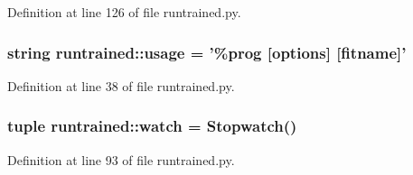 Definition at line 126 of file runtrained.py.

\hypertarget{namespaceruntrained_a4b1ea2d8f802d90d901c0d20819bc700}{
\subsubsection[{usage}]{\setlength{\rightskip}{0pt plus 5cm}string {\bf runtrained::usage} = '\%prog \mbox{[}options\mbox{]} \mbox{[}fitname\mbox{]}'}}
\label{namespaceruntrained_a4b1ea2d8f802d90d901c0d20819bc700}


Definition at line 38 of file runtrained.py.

\hypertarget{namespaceruntrained_a09e3ebddf40293824933bec6451dfd9a}{
\subsubsection[{watch}]{\setlength{\rightskip}{0pt plus 5cm}tuple {\bf runtrained::watch} = Stopwatch()}}
\label{namespaceruntrained_a09e3ebddf40293824933bec6451dfd9a}


Definition at line 93 of file runtrained.py.

